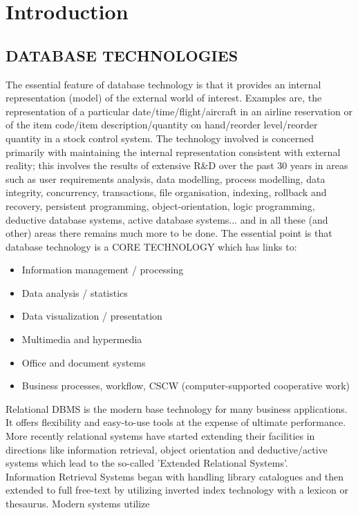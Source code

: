 \chapter{Introduction}
\thispagestyle{special}
\section{DATABASE TECHNOLOGIES}
The essential feature of database technology is that it provides an internal representation (model)
of the external world of interest. Examples are, the representation of a particular
date/time/flight/aircraft in an airline reservation or of the item code/item description/quantity on
hand/reorder level/reorder quantity in a stock control system.
The technology involved is concerned primarily with maintaining the internal representation
consistent with external reality; this involves the results of extensive R&D over the past 30 years
in areas such as user requirements analysis, data modelling, process modelling, data integrity,
concurrency, transactions, file organisation, indexing, rollback and recovery, persistent
programming, object-orientation, logic programming, deductive database systems, active database
systems... and in all these (and other) areas there remains much more to be done. The essential
point is that database technology is a CORE TECHNOLOGY which has links to:
\begin{itemize}
\item{Information management / processing
}
\item{Data analysis / statistics}
\item{Data visualization / presentation}
\item{Multimedia and hypermedia}
\item{Office and document systems}
\item{Business processes, workflow, CSCW (computer-supported cooperative work)}
\end{itemize}
Relational DBMS is the modern base technology for many business applications. It offers
flexibility and easy-to-use tools at the expense of ultimate performance. More recently relational
systems have started extending their facilities in directions like information retrieval, object orientation and deductive/active systems which lead to the so-called 'Extended Relational Systems'. 
\\
Information Retrieval Systems began with handling library catalogues and then extended to full
free-text by utilizing inverted index technology with a lexicon or thesaurus. Modern systems utilize
